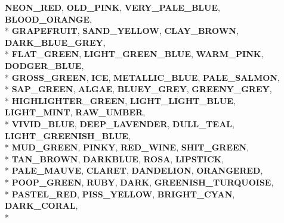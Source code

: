 \begin{DoxyCompactItemize}
{\bfseries N\+E\+O\+N\+\_\+\+R\+ED}, 
{\bfseries O\+L\+D\+\_\+\+P\+I\+NK}, 
{\bfseries V\+E\+R\+Y\+\_\+\+P\+A\+L\+E\+\_\+\+B\+L\+UE}, 
{\bfseries B\+L\+O\+O\+D\+\_\+\+O\+R\+A\+N\+GE}, 
\\*
{\bfseries G\+R\+A\+P\+E\+F\+R\+U\+IT}, 
{\bfseries S\+A\+N\+D\+\_\+\+Y\+E\+L\+L\+OW}, 
{\bfseries C\+L\+A\+Y\+\_\+\+B\+R\+O\+WN}, 
{\bfseries D\+A\+R\+K\+\_\+\+B\+L\+U\+E\+\_\+\+G\+R\+EY}, 
\\*
{\bfseries F\+L\+A\+T\+\_\+\+G\+R\+E\+EN}, 
{\bfseries L\+I\+G\+H\+T\+\_\+\+G\+R\+E\+E\+N\+\_\+\+B\+L\+UE}, 
{\bfseries W\+A\+R\+M\+\_\+\+P\+I\+NK}, 
{\bfseries D\+O\+D\+G\+E\+R\+\_\+\+B\+L\+UE}, 
\\*
{\bfseries G\+R\+O\+S\+S\+\_\+\+G\+R\+E\+EN}, 
{\bfseries I\+CE}, 
{\bfseries M\+E\+T\+A\+L\+L\+I\+C\+\_\+\+B\+L\+UE}, 
{\bfseries P\+A\+L\+E\+\_\+\+S\+A\+L\+M\+ON}, 
\\*
{\bfseries S\+A\+P\+\_\+\+G\+R\+E\+EN}, 
{\bfseries A\+L\+G\+AE}, 
{\bfseries B\+L\+U\+E\+Y\+\_\+\+G\+R\+EY}, 
{\bfseries G\+R\+E\+E\+N\+Y\+\_\+\+G\+R\+EY}, 
\\*
{\bfseries H\+I\+G\+H\+L\+I\+G\+H\+T\+E\+R\+\_\+\+G\+R\+E\+EN}, 
{\bfseries L\+I\+G\+H\+T\+\_\+\+L\+I\+G\+H\+T\+\_\+\+B\+L\+UE}, 
{\bfseries L\+I\+G\+H\+T\+\_\+\+M\+I\+NT}, 
{\bfseries R\+A\+W\+\_\+\+U\+M\+B\+ER}, 
\\*
{\bfseries V\+I\+V\+I\+D\+\_\+\+B\+L\+UE}, 
{\bfseries D\+E\+E\+P\+\_\+\+L\+A\+V\+E\+N\+D\+ER}, 
{\bfseries D\+U\+L\+L\+\_\+\+T\+E\+AL}, 
{\bfseries L\+I\+G\+H\+T\+\_\+\+G\+R\+E\+E\+N\+I\+S\+H\+\_\+\+B\+L\+UE}, 
\\*
{\bfseries M\+U\+D\+\_\+\+G\+R\+E\+EN}, 
{\bfseries P\+I\+N\+KY}, 
{\bfseries R\+E\+D\+\_\+\+W\+I\+NE}, 
{\bfseries S\+H\+I\+T\+\_\+\+G\+R\+E\+EN}, 
\\*
{\bfseries T\+A\+N\+\_\+\+B\+R\+O\+WN}, 
{\bfseries D\+A\+R\+K\+B\+L\+UE}, 
{\bfseries R\+O\+SA}, 
{\bfseries L\+I\+P\+S\+T\+I\+CK}, 
\\*
{\bfseries P\+A\+L\+E\+\_\+\+M\+A\+U\+VE}, 
{\bfseries C\+L\+A\+R\+ET}, 
{\bfseries D\+A\+N\+D\+E\+L\+I\+ON}, 
{\bfseries O\+R\+A\+N\+G\+E\+R\+ED}, 
\\*
{\bfseries P\+O\+O\+P\+\_\+\+G\+R\+E\+EN}, 
{\bfseries R\+U\+BY}, 
{\bfseries D\+A\+RK}, 
{\bfseries G\+R\+E\+E\+N\+I\+S\+H\+\_\+\+T\+U\+R\+Q\+U\+O\+I\+SE}, 
\\*
{\bfseries P\+A\+S\+T\+E\+L\+\_\+\+R\+ED}, 
{\bfseries P\+I\+S\+S\+\_\+\+Y\+E\+L\+L\+OW}, 
{\bfseries B\+R\+I\+G\+H\+T\+\_\+\+C\+Y\+AN}, 
{\bfseries D\+A\+R\+K\+\_\+\+C\+O\+R\+AL}, 
\\*

\end{DoxyCompactItemize}
